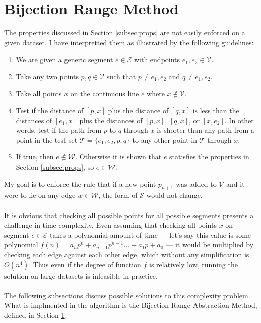 \documentclass[12pt]{article}
\begin{document}
\section{Bijection Range Method}\label{subsec:bijection-range-method}
The properties discussed in Section \ref{subsec:props} are not easily enforced
on a given dataset. I have interpretted them as illustrated by the following guidelines:
\begin{enumerate}
\item We are given a generic segment $e \in \mathcal{E}$ with endpoints
$e_1,e_2 \in \mathcal{V}$.
\item Take any two points $p,q \in \mathcal{V}$ such that $p \neq e_1,e_2$
and $q \neq e_1,e_2$.
\item Take all points $x$ on the continuous line $e$ where
$x \notin \mathcal{V}$.
\item Test if the distance of $[p,x]$ plus the distance of $[q,x]$
is less than the distances of $[e_1,x]$ plus the distances of
$[p,x]$, $[q,x]$, or $[x,e_2]$. In other words,
test if the path from $p$ to $q$ through $x$
is shorter than any path from a point in the test set $\mathcal{T} = \{e_1, e_2, p, q\}$
to any other point in $\mathcal{T}$ through $x$.
\item If true, then $e \notin \mathcal{W}$.
Otherwise it is shown that $e$ statisfies the
properties in Section \ref{subsec:props}, so $e \in \mathcal{W}$.
\end{enumerate}
My goal is to enforce the rule that if a new point $p_{n + 1}$ was added
to $\mathcal{V}$ and it were to lie on
any edge $w \in \mathcal{W}$, the form of $\mathcal{S}$ would not change.
\\\\
It is obvious that checking all possible points for all possible segments presents
a challenge in time complexity. Even assuming that checking all points $x$ on segment
$e \in \mathcal{E}$ takes a polynomial amount of time --- let's say this value is some
polynomial $f(n) = a_np^n + a_{n - 1}p^{n - 1} \dots + a_1p + a_0$ ---
it would be multiplied by checking each edge against each other edge, which
without any simplification is $O(n^4)$. Thus even if the degree of function $f$ is
relatively low, running the solution on large datasets is infeasible in practice.
\\\\
The following subsections discuss possible solutions to this complexity
problem. What is implmented in the algorithm is the Bijection Range Abstraction Method,
defined in Section \ref{subsec:bijection-range-method}.
\end{document}
